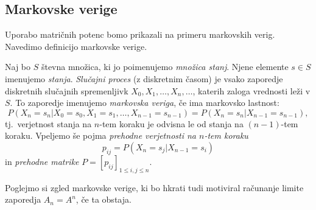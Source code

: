 \documentclass[mat1]{fmfdelo}
\begin{document}
\subsection{Markovske verige}\label{podpoglavjeMarkovskeVerige}

Uporabo matričnih potenc bomo prikazali na primeru markovskih verig. Navedimo definicijo markovske verige.
\begin{definicija}\label{definicijaMarkov}
    Naj bo $S$ števna množica, ki jo poimenujemo \emph{množica stanj}. Njene elemente $s \in S$ imenujemo \emph{stanja}. \emph{Slučajni proces} (z diskretnim časom) je vsako zaporedje diskretnih slučajnih spremenljivk $X_0, X_1, \ldots, X_n, \ldots$, katerih zaloga vrednosti leži v $S$. To zaporedje imenujemo \emph{markovska veriga}, če ima markovsko lastnost:
    \begin{equation*}
        P\left(X_n = s_n | X_0 = s_0, X_1 = s_1, \ldots, X_{n-1} = s_{n-1}\right) = P\left(X_n = s_n | X_{n-1} = s_{n-1}\right),
    \end{equation*}
    tj.\ verjetnost stanja na $n$-tem koraku je odvisna le od stanja na $(n-1)$-tem koraku. Vpeljemo še pojma \emph{prehodne verjetnosti na $n$-tem koraku}
    \begin{equation*}
        p_{ij} = P\left(X_n = s_j | X_{n-1} = s_i\right)
    \end{equation*}
    in \emph{prehodne matrike} $P = [p_{ij}]_{1 \leq i,j \leq n}$.
\end{definicija}
Poglejmo si zgled markovske verige, ki bo hkrati tudi motiviral računanje limite zaporedja $A_n = A^n$, če ta obstaja. 
\end{document}
